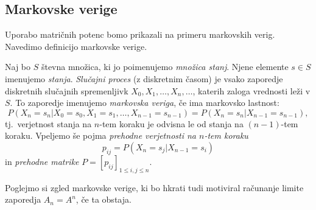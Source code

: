 \documentclass[mat1]{fmfdelo}
\begin{document}
\subsection{Markovske verige}\label{podpoglavjeMarkovskeVerige}

Uporabo matričnih potenc bomo prikazali na primeru markovskih verig. Navedimo definicijo markovske verige.
\begin{definicija}\label{definicijaMarkov}
    Naj bo $S$ števna množica, ki jo poimenujemo \emph{množica stanj}. Njene elemente $s \in S$ imenujemo \emph{stanja}. \emph{Slučajni proces} (z diskretnim časom) je vsako zaporedje diskretnih slučajnih spremenljivk $X_0, X_1, \ldots, X_n, \ldots$, katerih zaloga vrednosti leži v $S$. To zaporedje imenujemo \emph{markovska veriga}, če ima markovsko lastnost:
    \begin{equation*}
        P\left(X_n = s_n | X_0 = s_0, X_1 = s_1, \ldots, X_{n-1} = s_{n-1}\right) = P\left(X_n = s_n | X_{n-1} = s_{n-1}\right),
    \end{equation*}
    tj.\ verjetnost stanja na $n$-tem koraku je odvisna le od stanja na $(n-1)$-tem koraku. Vpeljemo še pojma \emph{prehodne verjetnosti na $n$-tem koraku}
    \begin{equation*}
        p_{ij} = P\left(X_n = s_j | X_{n-1} = s_i\right)
    \end{equation*}
    in \emph{prehodne matrike} $P = [p_{ij}]_{1 \leq i,j \leq n}$.
\end{definicija}
Poglejmo si zgled markovske verige, ki bo hkrati tudi motiviral računanje limite zaporedja $A_n = A^n$, če ta obstaja. 
\end{document}
